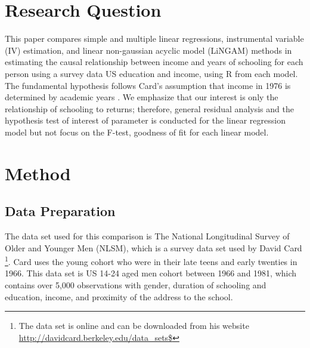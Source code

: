 \documentclass{article}\usepackage[]{graphicx}\usepackage[]{xcolor}
\begin{document}
\section{Research Question}
This paper compares simple and multiple linear regressions, instrumental variable (IV) estimation, and linear non-gaussian acyclic model (LiNGAM) methods in estimating the causal relationship between income and years of schooling for each person using a survey data US education and income, using R from each model.
The fundamental hypothesis follows Card's assumption that income in 1976 is determined by academic years \citep{card1993using}.
We emphasize that our interest is only the relationship of schooling to returns; therefore, general residual analysis and the hypothesis test of interest of parameter is conducted for the linear regression model but not focus on the F-test, goodness of fit for each linear model.

\section{Method}
\subsection*{Data Preparation}
The data set used for this comparison is The National Longitudinal Survey of Older and Younger Men (NLSM), which is a survey data set used by David Card \footnote{The data set is online and can be downloaded from his website \url{http://davidcard.berkeley.edu/data_sets$}}.
Card uses the young cohort who were in their late teens and early twenties in 1966.
This data set is US 14-24 aged men cohort between 1966 and 1981, which contains over 5,000 observations with gender, duration of schooling and education, income, and proximity of the address to the school.
\end{document}
